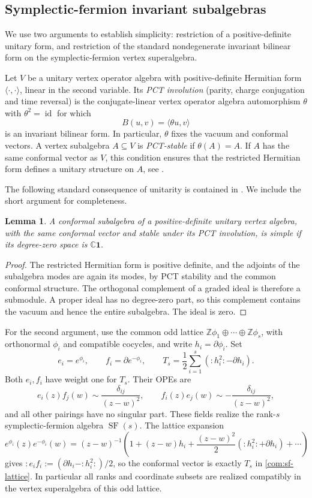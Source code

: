 \documentclass[11pt,a4paper]{amsart}
\numberwithin{equation}{section}
\newtheorem{lemma}[theorem]{Lemma}
\theoremstyle{definition}
\theoremstyle{remark}
\newcommand{\C}{\mathbb C}
\newcommand{\Z}{\mathbb Z}
\newcommand{\SF}{\operatorname{SF}}
\newcommand{\id}{\operatorname{id}}
\begin{document}
\subsection{Symplectic-fermion invariant subalgebras}
\label{com:scalar}
We use two arguments to establish simplicity: restriction of a positive-definite unitary form, and restriction of the standard nondegenerate invariant bilinear form on the symplectic-fermion vertex superalgebra.


Let $V$ be a unitary vertex operator algebra with positive-definite
Hermitian form $\langle\cdot,\cdot\rangle$, linear in the second variable.
Its \emph{PCT involution} (parity, charge conjugation and time reversal)
is the conjugate-linear vertex operator algebra automorphism $\theta$
with $\theta^2=\id$ for which
$$
 B(u,v)=\langle\theta u,v\rangle
$$
is an invariant bilinear form. In particular, $\theta$ fixes the vacuum
and conformal vectors. A vertex subalgebra $A\subseteq V$ is
\emph{PCT-stable} if $\theta(A)=A$. If $A$ has the same conformal
vector as $V$, this condition ensures that the restricted Hermitian
form defines a unitary structure on $A$, see
\cite[Section~5.1 and Proposition~5.23]{CarpiEtAl2018}.

The following standard consequence of unitarity is contained in
\cite[Propositions~5.3 and~5.23]{CarpiEtAl2018}. We include the short
argument for completeness.
\begin{lemma}\label{com:scalar-simple}
A conformal subalgebra of a positive-definite unitary vertex
algebra, with the same conformal vector and stable under its PCT
involution, is simple if its degree-zero space is
$\C\mathbf1$.
\end{lemma}
\begin{proof}
The restricted Hermitian form is positive definite, and the
adjoints of the subalgebra modes are again its modes, by PCT
stability and the common conformal structure. The orthogonal
complement of a graded ideal is therefore a submodule. A proper
ideal has no degree-zero part, so this complement contains the
vacuum and hence the entire subalgebra. The ideal is zero.
\end{proof}

For the second argument, use the common odd lattice
$\Z\phi_1\oplus\cdots\oplus\Z\phi_s$, with orthonormal
$\phi_i$ and compatible cocycles, and write $h_i=\partial\phi_i$.
Set
\begin{equation}\label{com:sf-lattice}
 e_i=e^{\phi_i},\qquad f_i=\partial e^{-\phi_i},\qquad
 T_s=\frac12\sum_{i=1}^s(:h_i^2:-\partial h_i).
\end{equation}
Both $e_i,f_i$ have weight one for $T_s$. Their OPEs are
$$
 e_i(z)f_j(w)\sim\frac{\delta_{ij}}{(z-w)^2},
 \qquad f_i(z)e_j(w)\sim-\frac{\delta_{ij}}{(z-w)^2},
$$
and all other pairings have no singular part. These fields
realize the rank-$s$ symplectic-fermion algebra $\SF(s)$.
The lattice expansion
$$
 e^{\phi_i}(z)e^{-\phi_i}(w)
 =(z-w)^{-1}\left(1+(z-w)h_i
       +\frac{(z-w)^2}{2}(:h_i^2:+\partial h_i)+\cdots\right)
$$
gives $:e_if_i:=(\partial h_i-:h_i^2:)/2$, so the conformal
vector is exactly $T_s$ in \eqref{com:sf-lattice}. In particular
all ranks and coordinate subsets are realized compatibly in the
vertex superalgebra of this odd lattice.
\end{document}

